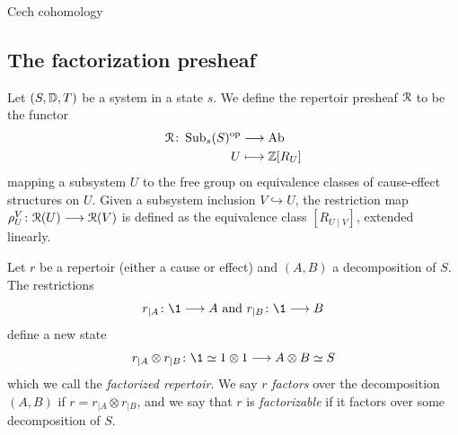 \begin{definition}
    Cech cohomology
\end{definition}




\subsection{The factorization presheaf}



\begin{definition}
    Let $(S,\D,T)$ be a system in a state $s$. We define the repertoir presheaf $\EuScript{R}$ to be the functor 
    \begin{align*}
        \EuScript{R}\: \Sub_s(S)\op &\to \Ab \\
        U &\longmapsto \Z[R_U]  
    \end{align*}
    mapping a subsystem $U$ to the free group on equivalence classes of cause-effect structures on $U$. Given a subsystem inclusion $V\hookrightarrow U$, the restriction map $\rho_U^V\: \EuScript{R}(U)\to \EuScript{R}(V)$ is defined as the equivalence class $[R_{U\mid V}]$, extended linearly.
\end{definition}

\begin{definition}
    Let $r$ be a repertoir (either a cause or effect) and $(A,B)$ a decomposition of $S$. The restrictions
    \[r_{\mid A}\: \1 \to A \text{ and } r_{\mid B}\: \1\to B\]
    define a new state 
    \[r_{\mid A}\otimes r_{\mid B}\: \1\simeq 1\otimes 1 \to A\otimes B \simeq S\]
    which we call the \emph{factorized repertoir}. We say $r$ \emph{factors} over the decomposition $(A,B)$ if $r= r_{\mid A}\otimes r_{\mid B}$, and we say that $r$ is \emph{factorizable} if it factors over some decomposition of $S$. 
\end{definition}

